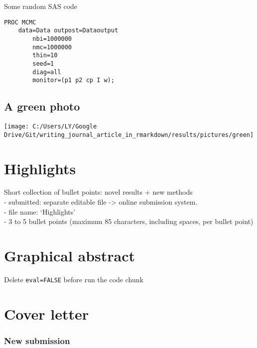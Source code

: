 \documentclass[review]{elsarticle} %
\let\origfigure\figure
\let\endorigfigure\endfigure
\renewenvironment{figure}[1][2] {
    \expandafter\origfigure\expandafter[H]
} {
    \endorigfigure
}
\begin{document}
Some random SAS code

\begin{verbatim}
PROC MCMC 
    data=Data outpost=Dataoutput 
        nbi=1000000 
        nmc=1000000
        thin=10
        seed=1
        diag=all
        monitor=(p1 p2 cp I w); 
\end{verbatim}

\subsection{A green photo}\label{a-green-photo}

\begin{figure}

{\centering \texttt{[image: C:/Users/LY/Google Drive/Git/writing\_journal\_article\_in\_rmarkdown/results/pictures/green]} 

}

\caption{A green photo}\label{fig:green}
\end{figure}

\newpage

\section*{Highlights}\label{highlight}

Short collection of bullet points: novel results + new methods\\
- submitted: separate editable file -\textgreater{} online submission
system.\\
- file name: `Highlights'\\
- 3 to 5 bullet points (maximum 85 characters, including spaces, per
bullet point)

\section*{Graphical abstract}\label{graphic}

Delete \texttt{eval=FALSE} before run the code chunk

\newpage

\section*{Cover letter}\label{cover-letter}

\subsubsection*{New submission}\label{new-submission}
\end{document}
